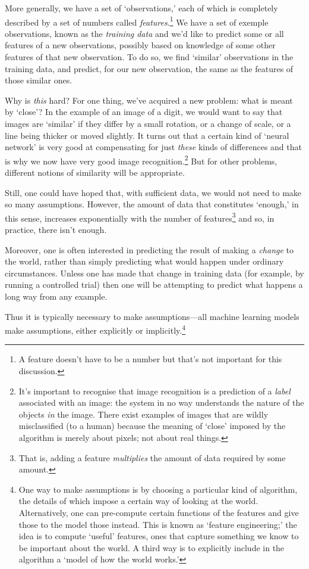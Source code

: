 \documentclass[10pt, a4paper, twocolumn]{article}
\begin{document}
More generally, we have a set of `observations,' each of which is completely
described by a set of numbers called \emph{features}.\footnote{A feature doesn't
have to be a number but that's not important for this discussion.}  We have a
set of exemple observations, known as the \emph{training data} and we'd like to
predict some or all features of a new observations, possibly based on knowledge
of some other features of that new observation. To do so, we find `similar'
observations in the training data, and predict, for our new observation, the
same as the features of those similar ones.

Why is \emph{this} hard? For one thing, we've acquired a new problem: what is
meant by `close'? In the example of an image of a digit, we would want to say
that images are `similar' if they differ by a small rotation, or a change of
scale, or a line being thicker or moved slightly. It turns out that a certain
kind of `neural network' is very good at compensating for just \emph{these}
kinds of differences and that is why we now have very good image
recognition.\footnote{It's important to recognise that image recognition is a
prediction of a \emph{label} associated with an image: the system in no way
understands the nature of the objects \emph{in} the image. There exist examples
of images that are wildly misclassified (to a human) because the meaning of
`close' imposed by the algorithm is merely about pixels; not about real things.}
But for other problems, different notions of similarity will be appropriate.

Still, one could have hoped that, with sufficient data, we would not need to
make so many assumptions. However, the amount of data that constitutes `enough,'
in this sense, increases exponentially with the number of features\footnote{That
is, adding a feature \emph{multiplies} the amount of data required by some
amount.} and so, in practice, there isn't enough.

Moreover, one is often interested in predicting the result of making a
\emph{change} to the world, rather than simply predicting what would happen
under ordinary circumstances. Unless one has made that change in training data
(for example, by running a controlled trial) then one will be attempting to
predict what happens a long way from any example.

Thus it is typically necessary to make assumptions---all machine learning models
make assumptions, either explicitly or implicitly.\footnote{One way to make
assumptions is by choosing a particular kind of algorithm, the details of which
impose a certain way of looking at the world. Alternatively, one can pre-compute
certain functions of the features and give those to the model those
instead. This is known as `feature engineering;' the idea is to compute `useful'
features, ones that capture something we know to be important about the world. A
third way is to explicitly include in the algorithm a `model of how the world
works.'}
\end{document}

